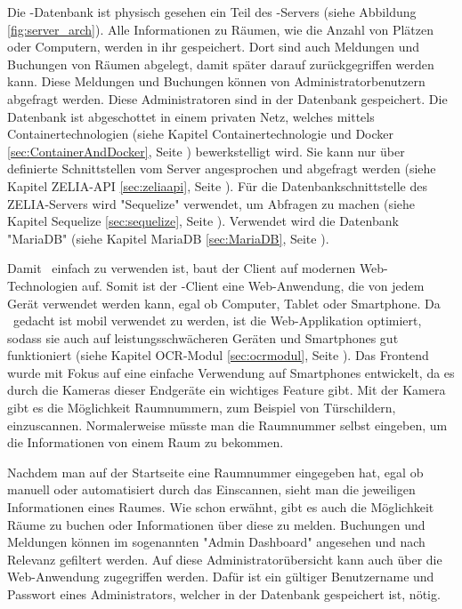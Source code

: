Die \ZELIA-Datenbank ist physisch gesehen ein Teil des \ZELIA-Servers (siehe Abbildung \ref{fig:server_arch}). Alle Informationen zu Räumen, wie die Anzahl von Plätzen oder Computern, werden in ihr gespeichert. Dort sind auch Meldungen und Buchungen von Räumen abgelegt, damit später darauf zurückgegriffen werden kann. Diese Meldungen und Buchungen können von Administratorbenutzern abgefragt werden. Diese Administratoren sind in der Datenbank gespeichert. Die Datenbank ist abgeschottet in einem privaten Netz, welches mittels Containertechnologien (siehe Kapitel Containertechnologie und Docker \ref{sec:ContainerAndDocker}, Seite \pageref{sec:ContainerAndDocker}) bewerkstelligt wird. Sie kann nur über definierte Schnittstellen vom Server angesprochen und abgefragt werden (siehe Kapitel ZELIA-API \ref{sec:zeliaapi}, Seite \pageref{sec:zeliaapi}). Für die Datenbankschnittstelle des ZELIA-Servers wird "Sequelize" verwendet, um Abfragen zu machen (siehe Kapitel Sequelize \ref{sec:sequelize}, Seite \pageref{sec:sequelize}). Verwendet wird die Datenbank "MariaDB" (siehe Kapitel MariaDB \ref{sec:MariaDB}, Seite \pageref{sec:sequelize}).



Damit \ZELIA\ einfach zu verwenden ist, baut der Client auf modernen Web-\-Techno\-logien auf. Somit ist der \ZELIA-Client eine Web-Anwendung,  die von jedem Gerät verwendet werden kann, egal ob Computer, Tablet oder Smartphone. Da \ZELIA\ gedacht ist mobil verwendet zu werden, ist die Web-Applikation optimiert, sodass sie auch auf leistungsschwächeren Geräten und Smartphones gut funktioniert (siehe Kapitel OCR-Modul \ref{sec:ocrmodul}, Seite \pageref{sec:ocrmodul}). Das Frontend wurde mit Fokus auf eine einfache Verwendung auf Smartphones entwickelt, da es durch die Kameras dieser Endgeräte ein wichtiges Feature gibt. Mit der Kamera gibt es die Möglichkeit Raumnummern, zum Beispiel von Türschildern, einzuscannen. Normalerweise müsste man die Raumnummer selbst eingeben, um die Informationen von einem Raum zu bekommen. 

Nachdem man auf der Startseite eine Raumnummer eingegeben hat, egal ob manuell oder automatisiert durch das Einscannen, sieht man die jeweiligen Informationen eines Raumes. Wie schon erwähnt, gibt es auch die Möglichkeit Räume zu buchen oder Informationen über diese zu melden. Buchungen und Meldungen können im sogenannten "Admin Dashboard" angesehen und nach Relevanz gefiltert werden. Auf diese Administratorübersicht kann auch über die Web-Anwendung zugegriffen werden. Dafür ist ein gültiger Benutzername und Passwort eines Administrators, welcher in der Datenbank gespeichert ist, nötig.

